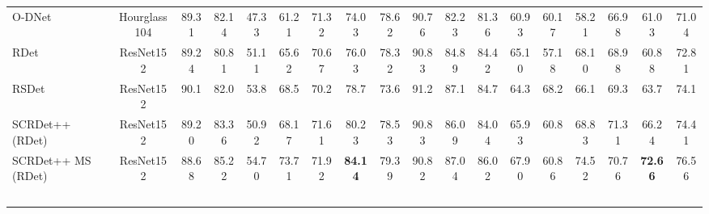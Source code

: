\documentclass[10pt,journal,compsoc]{IEEEtran}
\begin{document}
\begin{table*}
{\begin{tabular}{l|c|c|c|c|c|c|c|c|c|c|c|c|c|c|c|c|c}
			O-DNet \cite{wei2020oriented} & Hourglass104 \cite{newell2016stacked} & 89.31 & 82.14 & 47.33 & 61.21 & 71.32 & 74.03 & 78.62 & 90.76 & 82.23 & 81.36 & 60.93 & 60.17 & 58.21 & 66.98 & 61.03 & 71.04 \\
			RDet \cite{ yang2021r3det} & ResNet152 & 89.24 & 80.81 & 51.11 & 65.62 & 70.67 & 76.03 & 78.32 & 90.83 & 84.89 & 84.42 & 65.10 & 57.18 & 68.10 & 68.98 & 60.88 & 72.81\\
			RSDet \cite{qian2021learning} & ResNet152 & 90.1 & 82.0 & 53.8 & 68.5 & 70.2 & 78.7 & 73.6 & 91.2 & 87.1 & 84.7 & 64.3 & 68.2 & 66.1 & 69.3 & 63.7 & 74.1 \\ 
			SCRDet++ (RDet) & ResNet152 & 89.20 & 83.36 & 50.92 & 68.17 & 71.61 & 80.23 & 78.53 & 90.83 & 86.09 & 84.04 & 65.93 & 60.8 & 68.83 & 71.31 & 66.24 & 74.41 \\
			SCRDet++ MS (RDet) & ResNet152 & 88.68 & 85.22 & 54.70 & 73.71 & 71.92 & \textbf{84.14} & 79.39 & 90.82 & 87.04 & 86.02 & 67.90 & 60.86 & 74.52 & 70.76 & \textbf{72.66} & 76.56\\
			\hline
			
			~&\multicolumn{16}{c}{}\\
			

\end{tabular}}
\end{table*}
\end{document}
